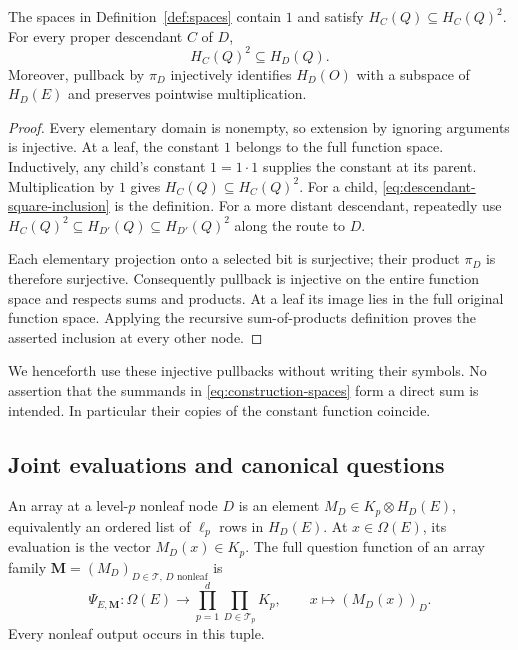 \begin{lemma}\label{lem:construction-space-properties}
The spaces in Definition~\ref{def:spaces} contain $1$ and satisfy
$H_C(Q)\subseteq H_C(Q)^2$.  For every proper descendant $C$ of $D$,
\begin{equation}\label{eq:descendant-square-inclusion}
 H_C(Q)^2\subseteq H_D(Q).
\end{equation}
Moreover, pullback by $\pi_D$ injectively identifies $H_D(O)$ with a
subspace of $H_D(E)$ and preserves pointwise multiplication.
\end{lemma}
\begin{proof}
Every elementary domain is nonempty, so extension by ignoring arguments
is injective.  At a leaf, the constant $1$ belongs to the full function
space.  Inductively, any child's constant $1=1\cdot1$ supplies the constant
at its parent.  Multiplication by $1$ gives $H_C(Q)\subseteq H_C(Q)^2$.
For a child, \eqref{eq:descendant-square-inclusion} is the definition.
For a more distant descendant, repeatedly use
$H_C(Q)^2\subseteq H_{D'}(Q)\subseteq H_{D'}(Q)^2$ along the route to $D$.

Each elementary projection onto a selected bit is surjective; their
product $\pi_D$ is therefore surjective.  Consequently pullback is
injective on the entire function space and respects sums and products.
At a leaf its image lies in the full original function space.  Applying
the recursive sum-of-products definition proves the asserted inclusion
at every other node.
\end{proof}

We henceforth use these injective pullbacks without writing their symbols.
No assertion that the summands in \eqref{eq:construction-spaces} form a
direct sum is intended.  In particular their copies of the constant
function coincide.

\subsection{Joint evaluations and canonical questions}

An array at a level-$p$ nonleaf node $D$ is an element
$M_D\in K_p\otimes H_D(E)$, equivalently an ordered list of $\ell_p$ rows
in $H_D(E)$.  At $x\in\Omega(E)$, its evaluation is the vector
$M_D(x)\in K_p$.  The full question function of an array family
$\mathbf M=(M_D)_{D\in\mathcal T,\,D\text{ nonleaf}}$ is
\begin{equation}\label{eq:joint-question-function}
 \Psi_{E,\mathbf M}:\Omega(E)\longrightarrow
       \prod_{p=1}^d\prod_{D\in\mathcal T_p}K_p,
 \qquad x\longmapsto (M_D(x))_D.
\end{equation}
Every nonleaf output occurs in this tuple.

